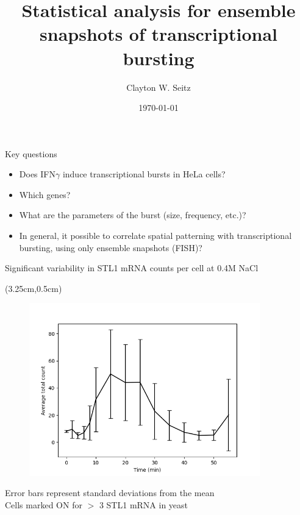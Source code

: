 \documentclass[aspectratio=1610]{beamer}					%
\title{Statistical analysis for ensemble snapshots of transcriptional bursting}	%
\author{Clayton W. Seitz}								%
\date{\today}									%
\begin{document}
\begin{frame}
  \titlepage
\end{frame}


%

\begin{frame}{Key questions}

\begin{itemize}
\item Does IFN$\gamma$ induce transcriptional bursts in HeLa cells?
\item Which genes?
\item What are the parameters of the burst (size, frequency, etc.)?
\item In general, it possible to correlate spatial patterning with transcriptional bursting, using only ensemble snapshots (FISH)?
\end{itemize}


\end{frame}

\begin{frame}{Significant variability in STL1 mRNA counts per cell at 0.4M NaCl}

\begin{textblock*}{5cm}(3.25cm,0.5cm)
\begin{figure}
\includegraphics[width=10cm]{avg-count.png}
\end{figure}
\end{textblock*}

\vspace{7.25cm}
Error bars represent standard deviations from the mean\\
Cells marked ON for $>$ 3 STL1 mRNA in yeast

\end{frame}
\end{document}
